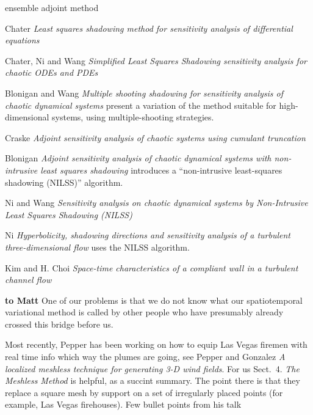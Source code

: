 \begin{description}
{ensemble adjoint method


Chater \etal{} {\em Least squares shadowing method for sensitivity
analysis of differential equations}

Chater, Ni and Wang {\em Simplified {Least Squares Shadowing}
sensitivity analysis for chaotic {ODEs} and {PDEs}}

Blonigan and Wang {\em Multiple shooting shadowing for sensitivity
analysis of chaotic dynamical systems} present a variation of the method suitable
for high-dimensional systems, using multiple-shooting strategies.

Craske
{\em Adjoint sensitivity analysis of chaotic systems using cumulant truncation}

Blonigan {\em Adjoint sensitivity analysis of chaotic dynamical
systems with non-intrusive least squares shadowing} introduces a ``non-intrusive
least-squares shadowing (NILSS)'' algorithm.

Ni and Wang {\em Sensitivity analysis on chaotic dynamical systems by
{Non-Intrusive Least Squares Shadowing ({NILSS})}}

Ni {\em Hyperbolicity, shadowing directions and sensitivity analysis of
a turbulent three-dimensional flow} uses the NILSS algorithm.

Kim and H. Choi
{\em Space-time characteristics of a compliant wall in a turbulent channel flow}

 { {\bf to Matt}
One of our problems is that we do not know what our spatiotemporal
variational method is called by other people who have presumably already
crossed this bridge before us.

Most recently, Pepper has been working on how to
equip Las Vegas firemen with real time info which way the plumes are going, see
Pepper and Gonzalez {\em A localized meshless technique for
generating {3-D} wind fields}. For us Sect.~4. {\em The Meshless Method} is
helpful, as a succint summary. The point there is that they replace a
square mesh by support on a set of irregularly placed points (for
example, Las Vegas firehouses). Few bullet points from his talk

}}
\end{description}
